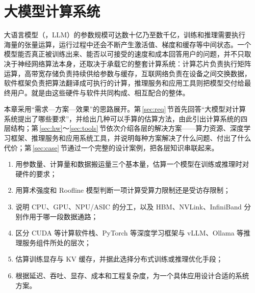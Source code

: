 \chapter{大模型计算系统}
\label{ch:system}

大语言模型（，LLM）的参数规模可达数十亿乃至数千亿，训练和推理需要执行海量的张量运算，运行过程中还会不断产生激活值、梯度和缓存等中间状态。一个模型能否真正被训练出来、能否以可接受的速度和成本回答用户的问题，并不只取决于神经网络算法本身，还取决于承载它的整套计算系统：计算芯片负责执行矩阵运算，高带宽存储负责持续供给参数与缓存，互联网络负责在设备之间交换数据，软件框架负责把算法翻译成可执行的计算，推理服务和应用工具则把模型交付给最终用户。就是由这些硬件与软件共同构成、相互配合的整体。

本章采用“需求—方案—效果”的思路展开。第\,\ref{sec:req}\,节首先回答“大模型对计算系统提出了哪些要求”，并给出几种可以手算的估算方法，由此引出计算系统的四层结构；第\,\ref{sec:hw}～\ref{sec:tools}\,节依次介绍各层的解决方案——算力资源、深度学习框架、推理服务和应用系统工具，并说明每种方案解决了什么问题、付出了什么代价；第\,\ref{sec:case}\,节通过一个完整的设计案例，把各层知识串联起来。

\begin{guide}
\begin{enumerate}[leftmargin=2em]
  \item 用参数量、计算量和数据搬运量三个基本量，估算一个模型在训练或推理时对硬件的要求；
  \item 用算术强度和 Roofline 模型判断一项计算受算力限制还是受访存限制；
  \item 说明 CPU、GPU、NPU/ASIC 的分工，以及 HBM、NVLink、InfiniBand 分别作用于哪一段数据通路；
  \item 区分 CUDA 等计算软件栈、PyTorch 等深度学习框架与 vLLM、Ollama 等推理服务组件所处的层次；
  \item 估算训练显存与 KV 缓存，并据此选择分布式训练或推理优化手段；
  \item 根据延迟、吞吐、显存、成本和工程复杂度，为一个具体应用设计合适的系统方案。
\end{enumerate}
\end{guide}
